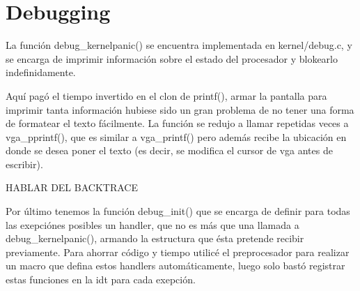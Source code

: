 \section{Debugging}

La función debug\_kernelpanic() se encuentra implementada en kernel/debug.c, y
se encarga de imprimir información sobre el estado del procesador y blokearlo
indefinidamente.

Aquí pagó el tiempo invertido en el clon de printf(), armar la pantalla para
imprimir tanta información hubiese sido un gran problema de no tener una forma
de formatear el texto fácilmente. La función se redujo a llamar repetidas veces
a vga\_pprintf(), que es similar a vga\_printf() pero además recibe la
ubicación en donde se desea poner el texto (es decir, se modifica el cursor de
vga antes de escribir).

HABLAR DEL BACKTRACE

Por último tenemos la función debug\_init() que se encarga de definir para
todas las exepciónes posibles un handler, que no es más que una llamada a
debug\_kernelpanic(), armando la estructura que ésta pretende recibir
previamente. Para ahorrar código y tiempo utilicé el preprocesador para
realizar un macro que defina estos handlers automáticamente, luego solo bastó
registrar estas funciones en la idt para cada exepción.

